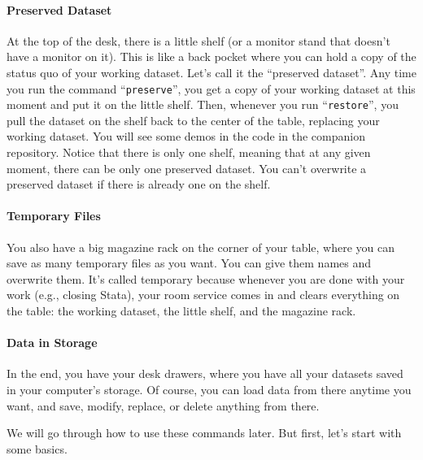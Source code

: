 \paragraph{Preserved Dataset} At the top of the desk, there is a little shelf (or a monitor stand that doesn't have a monitor on it). This is like a back pocket where you can hold a copy of the status quo of your working dataset. Let's call it the ``preserved dataset''. Any time you run the command ``\verb|preserve|'', you get a copy of your working dataset at this moment and put it on the little shelf. Then, whenever you run ``\verb|restore|'', you pull the dataset on the shelf back to the center of the table, replacing your working dataset. You will see some demos in the code in the companion repository. Notice that there is only one shelf, meaning that at any given moment, there can be only one preserved dataset. You can't overwrite a preserved dataset if there is already one on the shelf. 

\paragraph{Temporary Files} You also have a big magazine rack on the corner of your table, where you can save as many temporary files as you want. You can give them names and overwrite them. It's called temporary because whenever you are done with your work (e.g., closing Stata), your room service comes in and clears everything on the table: the working dataset, the little shelf, and the magazine rack. 

\paragraph{Data in Storage} In the end, you have your desk drawers, where you have all your datasets saved in your computer's storage. Of course, you can load data from there anytime you want, and save, modify, replace, or delete anything from there. 

We will go through how to use these commands later. But first, let's start with some basics. 

